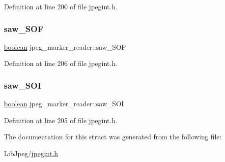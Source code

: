 Definition at line 200 of file jpegint.\+h.

\mbox{\label{structjpeg__marker__reader_a1bf77ef7dfb6dfe58a03d041eb0dcd40}} 
\subsubsection{\texorpdfstring{saw\_SOF}{saw\_SOF}}
{\footnotesize\ttfamily \mbox{\hyperlink{jmorecfg_8h_a7c6368b321bd9acd0149b030bb8275ed}{boolean}} jpeg\+\_\+marker\+\_\+reader\+::saw\+\_\+\+S\+OF}



Definition at line 206 of file jpegint.\+h.

\mbox{\label{structjpeg__marker__reader_ad67711d91054e97e76fbe5254aac644c}} 
\subsubsection{\texorpdfstring{saw\_SOI}{saw\_SOI}}
{\footnotesize\ttfamily \mbox{\hyperlink{jmorecfg_8h_a7c6368b321bd9acd0149b030bb8275ed}{boolean}} jpeg\+\_\+marker\+\_\+reader\+::saw\+\_\+\+S\+OI}



Definition at line 205 of file jpegint.\+h.



The documentation for this struct was generated from the following file\+:\begin{DoxyCompactItemize}
\item 
Lib\+Jpeg/\mbox{\hyperlink{jpegint_8h}{jpegint.\+h}}\end{DoxyCompactItemize}
